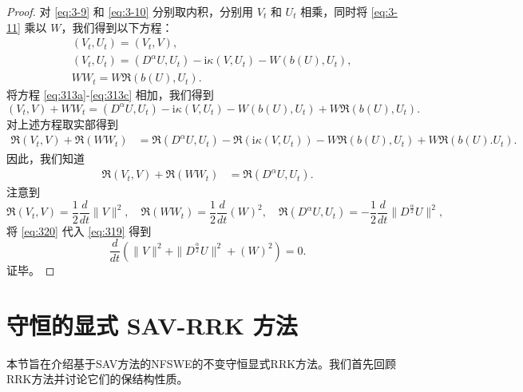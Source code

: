 	\begin{proof}
		对 \eqref{eq:3-9} 和 \eqref{eq:3-10} 分别取内积，分别用 $V_t$ 和 $U_t$ 相乘，同时将 \eqref{eq:3-11} 乘以 $W$，我们得到以下方程：
	\begin{align}
	&\left(V_t, U_t\right)=\left(V_t, V\right), \label{eq:313a}\\
	&\left(V_t, U_t\right)=\left(D^{\alpha} U, U_t\right)-\mathrm{i} \kappa\left(V, U_t\right)-W\left(b(U), U_t\right), \label{eq:313b}\\
	&W W_t=W\Re\left(b(U), U_t\right).\label{eq:313c}
	\end{align}
	将方程 \eqref{eq:313a}-\eqref{eq:313c} 相加，我们得到
	\begin{equation}
	\left(V_t, V\right) + W W_t= \left(D^{\alpha} U, U_t\right)-\mathrm{i} \kappa\left(V, U_t\right)-W\left(b(U), U_t\right) + W\Re\left(b(U), U_t\right).
	\end{equation}
	对上述方程取实部得到
	\begin{align}
	\Re\left(V_t, V\right) + \Re\left(W W_t\right)&= \Re\left(D^{\alpha} U, U_t\right)-\Re\left(\mathrm{i} \kappa\left(V, U_t\right)\right)-W\Re\left(b(U), U_t\right) + W\Re\left(b(U). U_t\right).
	\end{align}
	因此，我们知道
	\begin{align}
	\Re\left(V_t, V\right) + \Re\left(W W_t\right)&= \Re\left(D^{\alpha} U, U_t\right).\label{eq:319}
	\end{align}
	注意到
	\begin{equation}
	\Re\left(V_t, V\right) = \frac{1}{2}\frac{d }{d t}\|V\|^2, \quad \Re\left(W W_t\right) = \frac{1}{2}\frac{d }{d t}\left(W\right)^2,\quad \Re\left(D^{\alpha} U, U_t\right)=-\frac{1}{2}\frac{d }{d t}\|D^\frac{\alpha}{2}U\|^2,\label{eq:320}
	\end{equation}
	将 \eqref{eq:320} 代入 \eqref{eq:319} 得到
	\begin{equation}
	\frac{d }{d t}\left(\|V\|^2+\|D^\frac{\alpha}{2}U\|^2+\left(W\right)^2\right)=0.
	\end{equation}
	证毕。
	\end{proof}

	\section{守恒的显式 SAV-RRK 方法}\label{Section 4}
	本节旨在介绍基于SAV方法的NFSWE的不变守恒显式RRK方法。我们首先回顾RRK方法并讨论它们的保结构性质。
	
